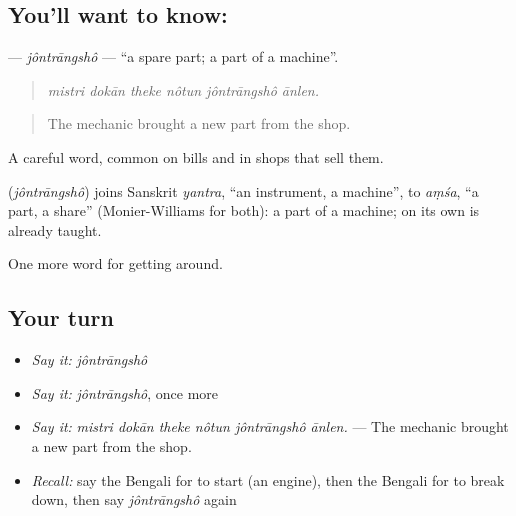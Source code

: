\subsection*{You'll want to know: }
\textbf{} — \emph{jôntrāngshô} — \textquotedblleft{}a spare part; a part of a machine\textquotedblright{}.

\begin{quote}
     
\end{quote}

\begin{quote}
\emph{mistri dokān theke nôtun jôntrāngshô ānlen.}
\end{quote}

\begin{quote}
The mechanic brought a new part from the shop.
\end{quote}

A careful word, common on bills and in shops that sell them.

\begin{cousinweb}
\textbf{} (\emph{jôntrāngshô}) joins Sanskrit \emph{yantra}, \textquotedblleft{}an instrument, a machine\textquotedblright{}, to \emph{aṃśa}, \textquotedblleft{}a part, a share\textquotedblright{} (Monier-Williams for both): a part of a machine;  on its own is already taught.
\end{cousinweb}

\begin{grammarlens}[title={What you've built}]
One more word for getting around.
\end{grammarlens}

\subsection*{Your turn}
\begin{itemize}
\raggedright
  \item \emph{Say it:} \emph{jôntrāngshô}
  \item \emph{Say it:} \emph{jôntrāngshô}, once more
  \item \emph{Say it:} \emph{mistri dokān theke nôtun jôntrāngshô ānlen.} — The mechanic brought a new part from the shop.
  \item \emph{Recall:} say the Bengali for to start (an engine), then the Bengali for to break down, then say \emph{jôntrāngshô} again
\end{itemize}

